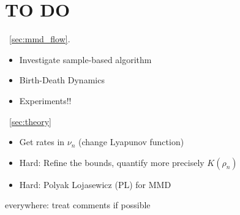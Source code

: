 \section*{TO DO}

~\cref{sec:mmd_flow}.
\begin{itemize}
	\item Investigate sample-based algorithm
	\item Birth-Death Dynamics
	\item Experiments!!
\end{itemize}

~\cref{sec:theory}
\begin{itemize}
	\item Get rates in $\nu_n$ (change Lyapunov function)
	\item Hard: Refine the bounds, quantify more precisely $K(\rho_n)$
	\item Hard: Polyak Lojasewicz (PL) for MMD
\end{itemize}
everywhere: treat comments if possible